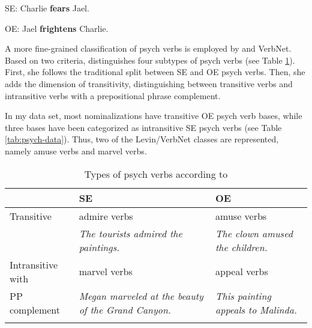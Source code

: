 \begin{exe}
	\ex \label{ex:SEvsOE}
	\begin{xlist}
		\item \label{ex:SEvsOE1} SE: Charlie \textbf{fears} Jael.
		\item \label{ex:SEvsOE2} OE: Jael \textbf{frightens} Charlie.
	\end{xlist}
\end{exe}

\noindent A more fine-grained classification of psych verbs is employed by \citet{Levin.1993} and VerbNet.
Based on two criteria, \citet[188--193]{Levin.1993} distinguishes four subtypes of psych verbs (see Table \ref{tab:psych}). 
First, she follows the traditional split between SE and OE psych verbs. 
Then, she adds the dimension of transitivity, distinguishing between transitive verbs and intransitive verbs with a prepositional phrase complement. 

In my data set, most nominalizations have transitive OE psych verb bases, while three bases have been categorized as intransitive SE psych verbs (see Table \ref{tab:psych-data}). Thus, two of the Levin/VerbNet classes are represented, namely amuse verbs and marvel verbs.

\begin{table} 
    \caption[Types of psych verbs]{\label{tab:psych}Types of psych verbs according to \citet[188--193]{Levin.1993}} 
    \begin{tabular}{
        >{\RaggedRight\arraybackslash}p{}
        >{\RaggedRight\arraybackslash}p{}
        >{\RaggedRight\arraybackslash}p{}
      }
      \lsptoprule
      & SE
      & OE\\ 
      \midrule
      Transitive
      & admire verbs 
      & amuse verbs \\ 
      & \textit{The tourists admired the paintings.} & \textit{The clown amused the children.} \\ 
      \addlinespace
      Intransitive with 
      & marvel verbs 
      & appeal verbs \\
      PP complement & \textit{Megan marveled at the beauty of the Grand Canyon.}  
      & \textit{This painting appeals to Malinda.} \\
      \lspbottomrule
    \end{tabular}
\end{table}

